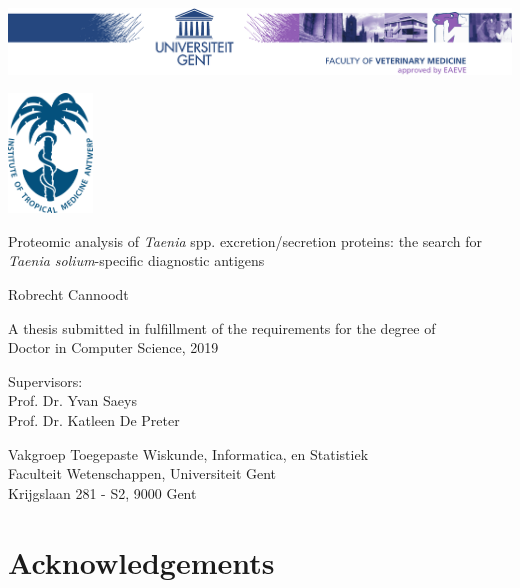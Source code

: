 
\begin{titlepage}
	\centering
	\includegraphics[width=\textwidth]{fig/DI-eps-converted-to.pdf}
	
	\vspace{1cm}
	
	\includegraphics[width=2.25cm]{fig/ITGlogo_new} 
	\vspace{2.25cm}
	
	{\Huge \textsf{Proteomic analysis of \textit{Taenia} spp. excretion/secretion proteins: the search for \textit{Taenia solium}-specific diagnostic antigens}}
	
	\vspace{2.25cm}
	
	{\LARGE \textsf{Robrecht Cannoodt}}
	
	\vspace{2.25cm}
	
	{\textsf{A thesis submitted in fulfillment of the requirements for the degree of \\Doctor in Computer Science, 2019}}
	
	\vfill
	
	{\textsf{Supervisors: \\
			Prof. Dr. Yvan Saeys\\Prof. Dr. Katleen De Preter}}
	
	\vfill
	
	{\textsf{Vakgroep Toegepaste Wiskunde, Informatica, en Statistiek\\
			Faculteit Wetenschappen, Universiteit Gent \\
			Krijgslaan 281 - S2, 9000 Gent}}
\end{titlepage}


\newpage{\thispagestyle{empty}\cleardoublepage}
\chapter{Acknowledgements}
\blindtext

